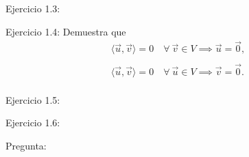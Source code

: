 \documentclass[12pt,dvipsnames]{article}
\numberwithin{equation}{section}
\begin{document}
\vspace{5mm}

Ejercicio 1.3: 

\vspace{5mm}

Ejercicio 1.4: Demuestra que
\begin{align*}
    \langle \vec{u}, \vec{v} \rangle = 0 \quad \forall \  \vec{v}\in V \implies \vec{u}=\vec{0}, \\
    \\
    \langle \vec{u}, \vec{v} \rangle = 0 \quad \forall \  \vec{u}\in V \implies \vec{v}=\vec{0}. \\
\end{align*}

\vspace{5mm}

Ejercicio 1.5:

\vspace{5mm}

Ejercicio 1.6:

\vspace{5mm}

Pregunta:
\end{document}
